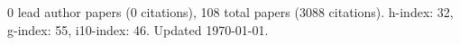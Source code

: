 0 lead author papers (0 citations),
108 total papers (3088 citations).\newline
h-index: 32, g-index: 55, i10-index: 46. Updated \today.